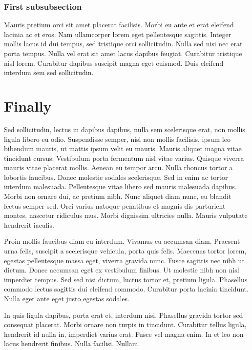 \documentclass{article}
\begin{document}
\subsubsection{First subsubsection}

Mauris pretium orci sit amet placerat facilisis. Morbi eu ante et erat eleifend lacinia ac et eros. Nam ullamcorper lorem eget pellentesque sagittis. Integer mollis lacus id dui tempus, sed tristique orci sollicitudin. Nulla sed nisi nec erat porta tempus. Nulla vel erat sit amet lacus dapibus feugiat. Curabitur tristique nisl lorem. Curabitur dapibus suscipit magna eget euismod. Duis eleifend interdum sem sed sollicitudin.

\section{Finally}

Sed sollicitudin, lectus in dapibus dapibus, nulla sem scelerisque erat, non mollis ligula libero eu odio. Suspendisse semper, nisl non mollis facilisis, ipsum leo bibendum mauris, ut mattis ipsum velit eu mauris. Mauris aliquet magna vitae tincidunt cursus. Vestibulum porta fermentum nisl vitae varius. Quisque viverra mauris vitae placerat mollis. Aenean eu tempor arcu. Nulla rhoncus tortor a lobortis faucibus. Donec molestie sodales scelerisque. Sed in enim ac tortor interdum malesuada. Pellentesque vitae libero sed mauris malesuada dapibus. Morbi non ornare dui, ac pretium nibh. Nunc aliquet diam nunc, eu blandit lectus semper sed. Orci varius natoque penatibus et magnis dis parturient montes, nascetur ridiculus mus. Morbi dignissim ultricies nulla. Mauris vulputate hendrerit iaculis.

Proin mollis faucibus diam eu interdum. Vivamus eu accumsan diam. Praesent urna felis, suscipit a scelerisque vehicula, porta quis felis. Maecenas tortor lorem, egestas pellentesque massa eget, viverra gravida nunc. Fusce sagittis nec nibh ut dictum. Donec accumsan eget ex vestibulum finibus. Ut molestie nibh non nisl imperdiet tempus. Sed sed nisi dictum, luctus tortor et, pretium ligula. Phasellus commodo lectus sagittis dui eleifend commodo. Curabitur porta lacinia tincidunt. Nulla eget ante eget justo egestas sodales.

In quis ligula dapibus, porta erat et, interdum nisi. Phasellus gravida tortor sed consequat placerat. Morbi ornare non turpis in tincidunt. Curabitur tellus ligula, hendrerit id nulla in, imperdiet varius erat. Fusce vel magna enim. In et leo non lacus hendrerit finibus. Nulla facilisi. Nullam.

\printbibliography
\end{document}
